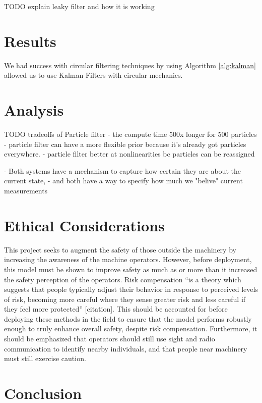 \documentclass[11pt]{amsart}
\begin{document}
TODO explain leaky filter and how it is working

\section{Results}

We had success with circular filtering techniques by using Algorithm \ref{alg:kalman} allowed us to use Kalman Filters with circular mechanics.


\section{Analysis}

TODO tradeoffs of Particle filter - the compute time 500x longer for 500 particles
- particle filter can have a more flexible prior because it's already got particles everywhere.
- particle filter better at nonlinearities bc particles can be reassigned

- Both systems have a mechanism to capture how certain they are about the current state,
- and both have a way to specify how much we "belive" current measurements

\section{Ethical Considerations}
This project seeks to augment the safety of those outside the machinery by increasing the awareness of the machine operators. However, before deployment, this model must be 
shown to improve safety as much as or more than it increased the safety perception of the operators. Risk compensation “is a theory which suggests that people typically adjust 
their behavior in response to perceived levels of risk, becoming more careful where they sense greater risk and less careful if they feel more protected” [citation]. This should 
be accounted for before deploying these methods in the field to ensure that the model performs robustly enough to truly enhance overall safety, despite risk compensation. Furthermore, 
it should be emphasized that operators should still use sight and radio communication to identify nearby individuals, and that people near machinery must still exercise caution. 

\section{Conclusion}
\end{document}

